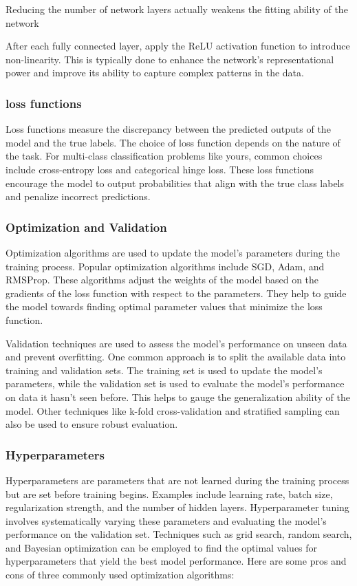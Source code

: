 Reducing the number of network layers actually weakens the fitting ability of the network

After each fully connected layer, apply the ReLU activation function to introduce non-linearity. This is typically done to enhance the network's representational power and improve its ability to capture complex patterns in the data.


\subsubsection{loss functions}
Loss functions measure the discrepancy between the predicted outputs of the model and the true labels. The choice of loss function depends on the nature of the task. For multi-class classification problems like yours, common choices include cross-entropy loss and categorical hinge loss. These loss functions encourage the model to output probabilities that align with the true class labels and penalize incorrect predictions.

\subsubsection{Optimization and Validation}
Optimization algorithms are used to update the model's parameters during the training process. Popular optimization algorithms include \ac{SGD}, \ac{Adam}, and \ac{RMSProp}. These algorithms adjust the weights of the model based on the gradients of the loss function with respect to the parameters. They help to guide the model towards finding optimal parameter values that minimize the loss function.

Validation techniques are used to assess the model's performance on unseen data and prevent overfitting. One common approach is to split the available data into training and validation sets. The training set is used to update the model's parameters, while the validation set is used to evaluate the model's performance on data it hasn't seen before. This helps to gauge the generalization ability of the model. Other techniques like k-fold cross-validation and stratified sampling can also be used to ensure robust evaluation.

\subsubsection{Hyperparameters}
Hyperparameters are parameters that are not learned during the training process but are set before training begins. Examples include learning rate, batch size, regularization strength, and the number of hidden layers. Hyperparameter tuning involves systematically varying these parameters and evaluating the model's performance on the validation set. Techniques such as grid search, random search, and Bayesian optimization can be employed to find the optimal values for hyperparameters that yield the best model performance.
Here are some pros and cons of three commonly used optimization algorithms:


